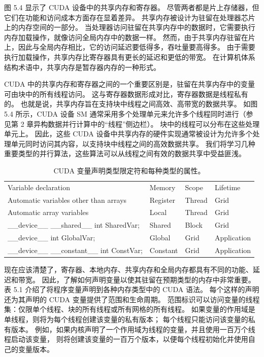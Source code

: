 图 5.4 显示了 CUDA 设备中的共享内存和寄存器。 尽管两者都是片上存储器，但它们在功能和访问成本方面存在显着差异。 
共享内存被设计为驻留在处理器芯片上的内存空间的一部分。 
当处理器访问驻留在共享内存中的数据时，它需要执行内存加载操作，就像访问全局内存中的数据一样。 
然而，由于共享内存驻留在片上，因此与全局内存相比，它的访问延迟要低得多，吞吐量要高得多。 
由于需要执行加载操作，共享内存比寄存器具有更长的延迟和更低的带宽。 
在计算机体系结构术语中，共享内存是暂存器内存的一种形式。

CUDA 中的共享内存和寄存器之间的一个重要区别是，驻留在共享内存中的变量可由块中的所有线程访问。 
这与寄存器数据形成对比，寄存器数据是线程私有的。 也就是说，共享内存旨在支持块中线程之间高效、高带宽的数据共享。 
如图 5.4 所示，CUDA 设备 SM 通常采用多个处理单元来允许多个线程同时进行（参见第 2 章异构数据并行计算中的“线程”侧边栏）。 
块中的线程可以分布在这些处理单元上。 
因此，这些 CUDA 设备中共享内存的硬件实现通常被设计为允许多个处理单元同时访问其内容，以支持块中线程之间的高效数据共享。 
我们将学习几种重要类型的并行算法，这些算法可以从线程之间有效的数据共享中受益匪浅。

\begin{table}[H]
\centering
\begin{tabular}{l|l|l|l}
	Variable declaration & Memory & Scope & Lifetime \\
	Automatic variables other than arrays & Register & Thread & Grid \\
	Automatic array variables & Local & Thread & Grid \\
	\_\_device\_\_ \_\_shared\_\_ int SharedVar; & Shared & Block & Grid \\
	\_\_device\_\_ int GlobalVar; & Global & Grid & Application \\
	\_\_device\_\_ \_\_constant\_\_ int ConstVar; & Constant & Grid & Application \\
\hline
\end{tabular}
\caption{CUDA 变量声明类型限定符和每种类型的属性。}
\end{table}

现在应该清楚了，寄存器、本地内存、共享内存和全局内存都具有不同的功能、延迟和带宽。 
因此，了解如何声明变量以使其驻留在预期类型的内存中非常重要。 表 5.1 介绍了将程序变量声明到各种内存类型中的 CUDA 语法。 
每个这样的声明还为其声明的 CUDA 变量提供了范围和生命周期。 
范围标识可以访问变量的线程集：仅限单个线程、块的所有线程或所有网格的所有线程。 
如果变量的作用域是单线程，则将为每个线程创建该变量的私有版本； 每个线程只能访问该变量的私有版本。 
例如，如果内核声明了一个作用域为线程的变量，并且使用一百万个线程启动该变量，
则将创建该变量的一百万个版本，以便每个线程初始化并使用自己的变量版本。

